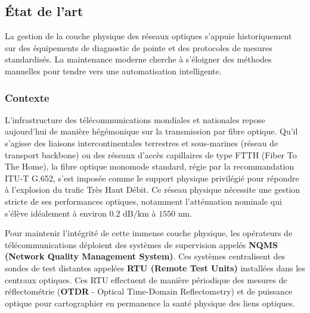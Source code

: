\documentclass[11pt,a4paper]{article}
\begin{document}
\subsection{État de l'art}
La gestion de la couche physique des réseaux optiques s'appuie historiquement sur des équipements de diagnostic de pointe et des protocoles de mesures standardisés. La maintenance moderne cherche à s'éloigner des méthodes manuelles pour tendre vers une automatisation intelligente.

\subsubsection{Contexte}
L'infrastructure des télécommunications mondiales et nationales repose aujourd'hui de manière hégémonique sur la transmission par fibre optique. Qu'il s'agisse des liaisons intercontinentales terrestres et sous-marines (réseau de transport backbone) ou des réseaux d'accès capillaires de type FTTH (Fiber To The Home), la fibre optique monomode standard, régie par la recommandation ITU-T G.652, s'est imposée comme le support physique privilégié pour répondre à l'explosion du trafic Très Haut Débit. Ce réseau physique nécessite une gestion stricte de ses performances optiques, notamment l'atténuation nominale qui s'élève idéalement à environ $0.2 \text{ dB/km}$ à $1550 \text{ nm}$.

Pour maintenir l'intégrité de cette immense couche physique, les opérateurs de télécommunications déploient des systèmes de supervision appelés \textbf{NQMS (Network Quality Management System)}. Ces systèmes centralisent des sondes de test distantes appelées \textbf{RTU (Remote Test Units)} installées dans les centraux optiques. Ces RTU effectuent de manière périodique des mesures de réflectométrie (\textbf{OTDR} - Optical Time-Domain Reflectometry) et de puissance optique pour cartographier en permanence la santé physique des liens optiques.
\end{document}
